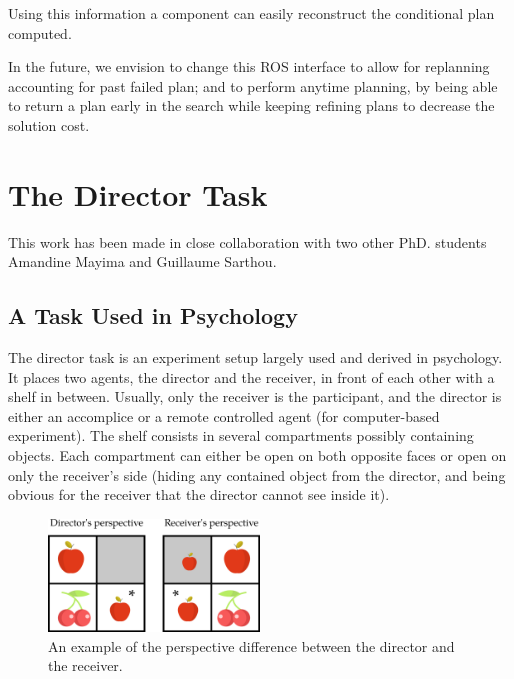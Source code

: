 \documentclass[a4paper,11pt,twoside]{StyleThese}
\begin{document}
Using this information a component can easily reconstruct the conditional plan computed.

In the future, we envision to change this ROS interface to allow for replanning accounting for past failed plan; and to perform anytime planning, by being able to return a plan early in the search while keeping refining plans to decrease the solution cost.

\section{The Director Task}
This work has been made in close collaboration with two other PhD. students Amandine Mayima and Guillaume Sarthou.

\subsection{A Task Used in Psychology}
The director task is an experiment setup largely used and derived in psychology. It places two agents, the director and the receiver, in front of each other with a shelf in between. Usually, only the receiver is the participant, and the director is either an accomplice or a remote controlled agent (for computer-based experiment). The shelf consists in several compartments possibly containing objects. Each compartment can either be open on both opposite faces or open on only the receiver's side (hiding any contained object from the director, and being obvious for the receiver that the director cannot see inside it).

\begin{figure}[hbtp]
\centering
\includegraphics[width=0.5\textwidth]{figures/chapter5/dt_apple.png}
\caption{An example of the perspective difference between the director and the receiver.}
\label{fig:chap5dtapple}
\end{figure}
\end{document}
